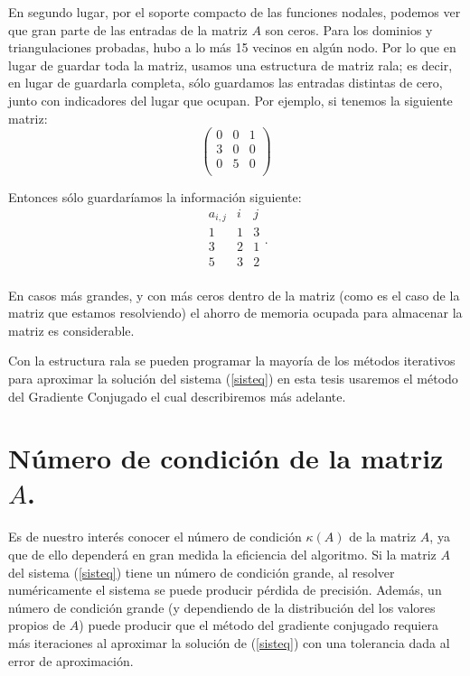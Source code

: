 \documentclass[12pt,spanish,oneside]{book}
\theoremstyle{plain}
\numberwithin{equation}{chapter}
\theoremstyle{definition}
\theoremstyle{remark}
\begin{document}
En segundo lugar, por el soporte compacto de las funciones nodales, podemos ver que gran parte de las entradas de la matriz $A$ son ceros. Para los dominios y triangulaciones probadas, hubo a lo más 15 vecinos en algún nodo. Por lo que en lugar de guardar toda la matriz, usamos una estructura de matriz rala; es decir, en lugar de guardarla completa, sólo guardamos las entradas distintas de cero, junto con indicadores del lugar que ocupan. Por ejemplo, si tenemos la siguiente matriz: 
\begin{equation*}
\begin{pmatrix}
		0 & 0 & 1 \\
		3 & 0 & 0 \\
		0 & 5 & 0 \\
\end{pmatrix}
\end{equation*}

Entonces sólo guardaríamos la información siguiente: 
\begin{equation*}
	\begin{array}{cccc}
		a_{i,j} & i & j\\
		1 & 1 & 3 \\
		3 & 2 & 1 \\
		5 & 3 & 2 \\
	\end{array}.
\end{equation*}

En casos más grandes, y con más ceros dentro de la matriz (como es el caso de la matriz que estamos resolviendo) el ahorro de memoria ocupada para almacenar la matriz es considerable.

Con la estructura rala se pueden programar la mayoría de los métodos iterativos para aproximar la solución del sistema (\ref{sisteq}) en esta tesis usaremos el método del Gradiente Conjugado el cual describiremos más adelante.

\section{Número de condición de la matriz $A$.}

Es de nuestro interés conocer el número de condición $\kappa(A)$ de la matriz $A$, ya que de ello dependerá en gran medida la eficiencia del algoritmo. Si la matriz $A$ del sistema (\ref{sisteq}) tiene un número de condición grande, al resolver numéricamente el sistema se puede producir pérdida de precisión. Además, un número de condición grande (y dependiendo de la distribución del los valores propios de $A$) puede producir que el método del gradiente conjugado requiera más iteraciones al aproximar la solución de (\ref{sisteq}) con una tolerancia dada al error de aproximación.
\end{document}
